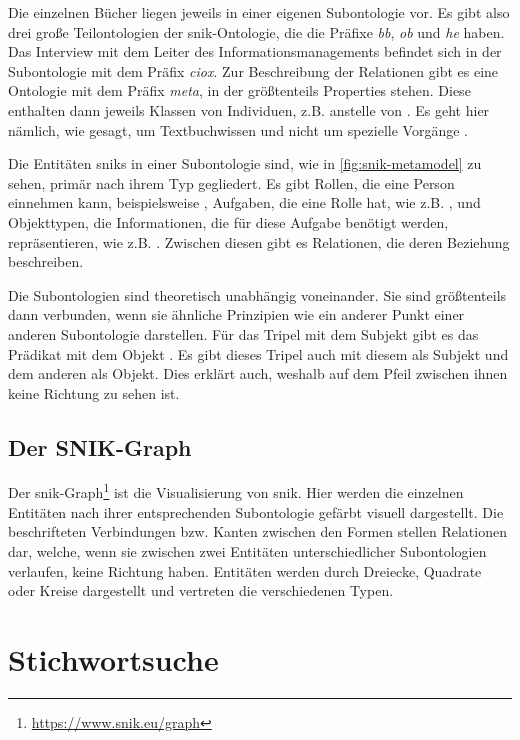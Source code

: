 Die einzelnen Bücher liegen jeweils in einer eigenen Subontologie vor.
Es gibt also drei große Teilontologien der \ac{snik}-Ontologie, die die Präfixe \emph{bb}, \emph{ob} und \emph{he} haben.
Das Interview mit dem Leiter des Informationsmanagements befindet sich in der Subontologie mit dem Präfix \emph{ciox}.
Zur Beschreibung der Relationen gibt es eine Ontologie mit dem Präfix \emph{meta}, in der größtenteils Properties stehen.
Diese enthalten dann jeweils Klassen von Individuen, z.B.  anstelle von .
Es geht hier nämlich, wie gesagt, um Textbuchwissen und nicht um spezielle Vorgänge \citep{sniktec}.

Die Entitäten \ac{snik}s in einer Subontologie sind, wie in \cref{fig:snik-metamodel} zu sehen, primär nach ihrem Typ gegliedert.
Es gibt Rollen, die eine Person einnehmen kann, beispielsweise , Aufgaben, die eine Rolle hat, wie z.B. ,
und Objekttypen, die Informationen, die für diese Aufgabe benötigt werden, repräsentieren, wie z.B. .
Zwischen diesen gibt es Relationen, die deren Beziehung beschreiben.

Die Subontologien sind theoretisch unabhängig voneinander. Sie sind größtenteils dann verbunden,
wenn sie ähnliche Prinzipien wie ein anderer Punkt einer anderen Subontologie darstellen.
Für das Tripel mit dem Subjekt  gibt es das Prädikat  mit dem Objekt .
Es gibt dieses Tripel auch mit diesem als Subjekt und dem anderen als Objekt.
Dies erklärt auch, weshalb auf dem Pfeil zwischen ihnen keine Richtung zu sehen ist.


\subsection{Der SNIK-Graph}

Der \ac{snik}-Graph\footnote{\url{https://www.snik.eu/graph}} ist die Visualisierung von \ac{snik}.
Hier werden die einzelnen Entitäten nach ihrer entsprechenden Subontologie gefärbt visuell dargestellt.
Die beschrifteten Verbindungen bzw. Kanten zwischen den Formen stellen Relationen dar,
welche, wenn sie zwischen zwei Entitäten unterschiedlicher Subontologien verlaufen, keine Richtung haben.
Entitäten werden durch Dreiecke, Quadrate oder Kreise dargestellt und vertreten die verschiedenen Typen.

\section{Stichwortsuche}

